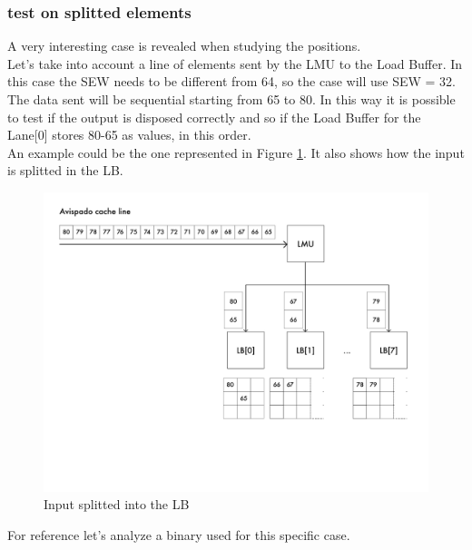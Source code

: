 \subsubsection{test on splitted elements} 
A very interesting case is revealed when studying the positions.\\
Let's take into account a line of elements sent by the LMU to the Load Buffer. In this case the SEW needs to be different from 64, so the case will use SEW = 32.\\

The data sent will be sequential starting from 65 to 80. In this way it is possible to test if the output is disposed correctly and so if the Load Buffer for the Lane[0] stores 80-65 as values, in this order.\\

An example could be the one represented in Figure \ref{cache-to-lb-split-ex}. It also shows how the input is splitted in the LB.

\begin{figure}[H]
    \centering
    \includegraphics[scale = 0.6]{Chapter_2/img/cache-to-lb-split-ex.png}
    \caption{Input splitted into the LB}
    \label{cache-to-lb-split-ex}
\end{figure}

For reference let's analyze a binary used for this specific case.
\newpage

